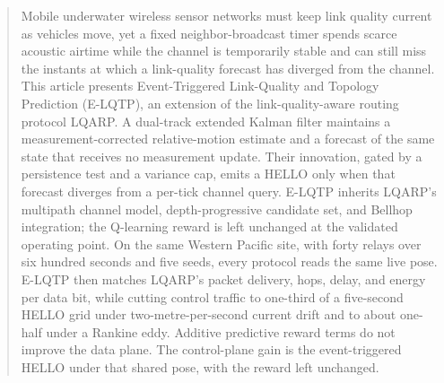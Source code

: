 \begin{abstract}
Mobile underwater wireless sensor networks must keep link quality
current as vehicles move, yet a fixed neighbor-broadcast timer spends
scarce acoustic airtime while the channel is temporarily stable and
can still miss the instants at which a link-quality forecast has
diverged from the channel. This article presents Event-Triggered
Link-Quality and Topology Prediction (E-LQTP), an extension of the
link-quality-aware routing protocol LQARP. A dual-track extended
Kalman filter maintains a measurement-corrected relative-motion
estimate and a forecast of the same state that receives no
measurement update. Their innovation, gated by a persistence test and
a variance cap, emits a HELLO only when that forecast diverges from a
per-tick channel query. E-LQTP inherits LQARP's multipath channel
model, depth-progressive candidate set, and Bellhop integration; the
Q-learning reward is left unchanged at the validated operating point.
On the same Western Pacific site, with forty relays over six hundred
seconds and five seeds, every protocol reads the same live pose.
E-LQTP then matches LQARP's packet delivery, hops, delay, and energy
per data bit, while cutting control traffic to one-third of a
five-second HELLO grid under two-metre-per-second current drift and
to about one-half under a Rankine eddy. Additive predictive reward
terms do not improve the data plane. The control-plane gain is the
event-triggered HELLO under that shared pose, with the reward left
unchanged.
\end{abstract}
